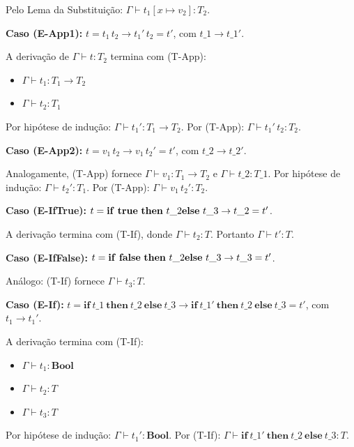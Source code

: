 Pelo Lema da Substituição: \(\Gamma \vdash t_1[x \mapsto v_2] : T_2\).

\textbf{Caso (E-App1):} \(t = t_1\, t_2 \to t_1'\, t_2 = t'\), com
\(t\_1 \to t\_1'\).

A derivação de \(\Gamma \vdash t : T_2\) termina com (T-App):

\begin{itemize}
  \item
    \(\Gamma \vdash t_1 : T_1 \to T_2\)
  \item
    \(\Gamma \vdash t_2 : T_1\)
\end{itemize}

Por hipótese de indução: \(\Gamma \vdash t_1' : T_1 \to T_2\). Por
(T-App): \(\Gamma \vdash t_1'\, t_2 : T_2\).

\textbf{Caso (E-App2):} \(t = v_1\, t_2 \to v_1\, t_2' = t'\), com
\(t\_2 \to t\_2'\).

Analogamente, (T-App) fornece \(\Gamma \vdash v_1 : T_1 \to T_2\) e
\(\Gamma \vdash t\_2 : T\_1\). Por hipótese
de indução: \(\Gamma \vdash t_2' : T_1\). Por (T-App): \(\Gamma
\vdash v_1\, t_2' : T_2\).

\textbf{Caso (E-IfTrue):} \(t =
  \mathbf{if}~\mathbf{true}~\mathbf{then}~t\_2\\
\mathbf{else}~t\_3 \to t\_2 = t'\).

A derivação termina com (T-If), donde \(\Gamma \vdash t_2 : T\).
Portanto \(\Gamma \vdash t' : T\).

\textbf{Caso (E-IfFalse):} \(t =
  \mathbf{if}~\mathbf{false}~\mathbf{then}~t\_2\\
\mathbf{else}~t\_3 \to t\_3 = t'\).

Análogo: (T-If) fornece \(\Gamma \vdash t_3 : T\).

\textbf{Caso (E-If):} \(t =
  \mathbf{if}~t\_1~\mathbf{then}~t\_2~\mathbf{else}~t\_3 \to
  \mathbf{if}~t\_1'~\mathbf{then}~t\_2~\mathbf{else}~t\_3 =
t'\), com \(t_1 \to t_1'\).

A derivação termina com (T-If):

\begin{itemize}
  \item
    \(\Gamma \vdash t_1 : \mathbf{Bool}\)
  \item
    \(\Gamma \vdash t_2 : T\)
  \item
    \(\Gamma \vdash t_3 : T\)
\end{itemize}

Por hipótese de indução: \(\Gamma \vdash t_1' : \mathbf{Bool}\). Por
(T-If): \(\Gamma \vdash
\mathbf{if}~t\_1'~\mathbf{then}~t\_2~\mathbf{else}~t\_3 : T\).

